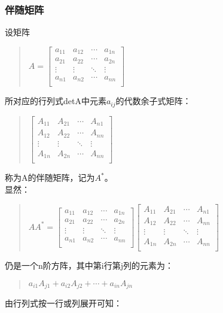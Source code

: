 \documentclass[a4paper,10pt]{article}
\begin{document}
\begin{CJK}{UTF8}{song}
\subsubsection{伴随矩阵}
设矩阵
\begin{quote}
$A=\left[\begin{array}{cccc}
a_{11}&a_{12}&\cdots{}&a_{1n} \\
a_{21}&a_{22}&\cdots{}&a_{2n} \\
\vdots&\vdots&\ddots{}&\vdots \\
a_{n1}&a_{n2}&\cdots{}&a_{nn} \\          
\end{array}\right]   $
\end{quote}
所对应的行列式detA中元素$a_{ij}$的代数余子式矩阵：
\begin{quote}
$\left[\begin{array}{cccc}
A_{11}&A_{21}&\cdots{}&A_{n1} \\
A_{12}&A_{22}&\cdots{}&A_{nn} \\
\vdots&\vdots&\ddots{}&\vdots \\
A_{1n}&A_{2n}&\cdots{}&A_{nn} \\          
\end{array}\right]   $
\end{quote}
称为A的伴随矩阵，记为$A^{*}$。 \\
显然：
\begin{quote}
$AA^{*}=\left[\begin{array}{cccc}
a_{11}&a_{12}&\cdots{}&a_{1n} \\
a_{21}&a_{22}&\cdots{}&a_{2n} \\
\vdots&\vdots&\ddots{}&\vdots \\
a_{n1}&a_{n2}&\cdots{}&a_{nn} \\          
\end{array}\right]
\left[\begin{array}{cccc}
A_{11}&A_{21}&\cdots{}&A_{n1} \\
A_{12}&A_{22}&\cdots{}&A_{nn} \\
\vdots&\vdots&\ddots{}&\vdots \\
A_{1n}&A_{2n}&\cdots{}&A_{nn} \\          
\end{array}\right] $
\end{quote}
仍是一个n阶方阵，其中第i行第j列的元素为：
\begin{quote}
$a_{i1}A_{j1}+a_{i2}A_{j2}+\cdots{}+a_{in}A_{jn}$
\end{quote}
由行列式按一行或列展开可知：
\begin{quote}

\end{quote}
\end{CJK}
\end{document}
